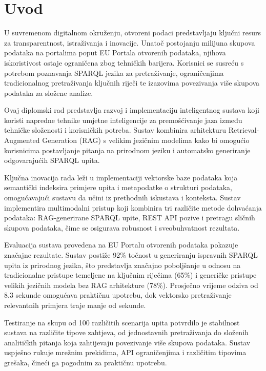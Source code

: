 \chapter{Uvod}
\label{ch:introduction_background}


U suvremenom digitalnom okruženju, otvoreni podaci predstavljaju ključni resurs za transparentnost, istraživanja i inovacije. Unatoč postojanju milijuna skupova podataka na portalima poput EU Portala otvorenih podataka, njihova iskoristivost ostaje ograničena zbog tehničkih barijera. Korisnici se susreću s potrebom poznavanja SPARQL jezika za pretraživanje, ograničenjima tradicionalnog pretraživanja ključnih riječi te izazovima povezivanja više skupova podataka za složene analize.

Ovaj diplomski rad predstavlja razvoj i implementaciju inteligentnog sustava koji koristi napredne tehnike umjetne inteligencije za premošćivanje jaza između tehničke složenosti i korisničkih potreba. Sustav kombinira arhitekturu Retrieval-Augmented Generation (RAG) s velikim jezičnim modelima kako bi omogućio korisnicima postavljanje pitanja na prirodnom jeziku i automatsko generiranje odgovarajućih SPARQL upita.

Ključna inovacija rada leži u implementaciji vektorske baze podataka koja semantički indeksira primjere upita i metapodatke o strukturi podataka, omogućavajući sustavu da učini iz prethodnih iskustava i konteksta. Sustav implementira multimodalni pristup koji kombinira tri različite metode dohvaćanja podataka: RAG-generirane SPARQL upite, REST API pozive i pretragu sličnih skupova podataka, čime se osigurava robusnost i sveobuhvatnost rezultata.

Evaluacija sustava provedena na EU Portalu otvorenih podataka pokazuje značajne rezultate. Sustav postiže 92\% točnost u generiranju ispravnih SPARQL upita iz prirodnog jezika, što predstavlja značajno poboljšanje u odnosu na tradicionalne pristupe temeljene na ključnim riječima (65\%) i generičke pristupe velikih jezičnih modela bez RAG arhitekture (78\%). Prosječno vrijeme odziva od 8.3 sekunde omogućava praktičnu upotrebu, dok vektorsko pretraživanje relevantnih primjera traje manje od sekunde.

Testiranje na skupu od 100 različitih scenarija upita potvrdilo je stabilnost sustava na različite tipove zahtjeva, od jednostavnih pretraživanja do složenih analitičkih pitanja koja zahtijevaju povezivanje više skupova podataka. Sustav uspješno rukuje mrežnim prekidima, API ograničenjima i različitim tipovima grešaka, čineći ga pogodnim za praktičnu upotrebu.

